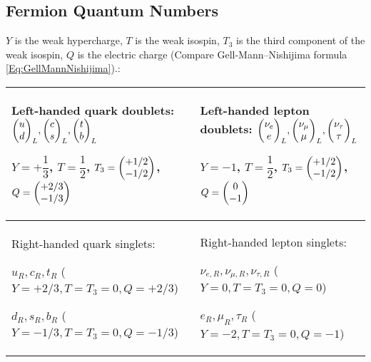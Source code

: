 		\newpage
	\subsection{Fermion Quantum Numbers}
		\label{Sec:FermionConstants}
		$Y$ is the weak hypercharge, $T$ is the weak isospin, $T_3$ is the third component of the weak isospin, $Q$ is the electric charge (Compare Gell-Mann--Nishijima formula \ref{Eq:GellMannNishijima}).:
		\begin{center}
			\begin{tabular}{| L{.46\textwidth} | L{.46\textwidth} |}
				\hline
				Left-handed quark doublets:
				$\doublet{u}{d}_L, \doublet{c}{s}_L, \doublet{t}{b}_L$

				$Y=+\dfrac{1}{3}$, $T=\dfrac{1}{2}$,
				$T_3=\doublet{+1/2}{-1/2}$, $Q=\doublet{+2/3}{-1/3}$
				&
				Left-handed lepton doublets: $\doublet{\nu_e}{e}_L, \doublet{\nu_\mu}{\mu}_L, \doublet{\nu_\tau}{\tau}_L$

				$Y=-1$, $T=\dfrac{1}{2}$,
				$T_3=\doublet{+1/2}{-1/2}$, $Q=\doublet{0}{-1}$
				\\
				\hline
				Right-handed quark singlets:

				$u_R,c_R,t_R$ ($Y=+2/3, T=T_3=0, Q=+2/3$)

				$d_R,s_R,b_R$ ($Y=-1/3, T=T_3=0, Q=-1/3$)
				&
				Right-handed lepton singlets:

				$\nu_{e,R}, \nu_{\mu,R}, \nu_{\tau,R}$ ($Y=0, T=T_3=0, Q=0$)

				$e_R, \mu_R, \tau_R$ ($Y=-2, T=T_3=0, Q=-1$)
				\\
				\hline
			\end{tabular}
		\end{center}

		\renewcommand{\arraystretch}{2.0}
